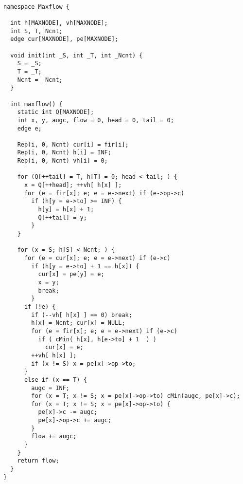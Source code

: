 \begin{lstlisting}

namespace Maxflow {

  int h[MAXNODE], vh[MAXNODE];
  int S, T, Ncnt;
  edge cur[MAXNODE], pe[MAXNODE];

  void init(int _S, int _T, int _Ncnt) {
    S = _S;
    T = _T;
    Ncnt = _Ncnt;
  }

  int maxflow() {
    static int Q[MAXNODE];
    int x, y, augc, flow = 0, head = 0, tail = 0;
    edge e;
    
    Rep(i, 0, Ncnt) cur[i] = fir[i];
    Rep(i, 0, Ncnt) h[i] = INF;
    Rep(i, 0, Ncnt) vh[i] = 0;

    for (Q[++tail] = T, h[T] = 0; head < tail; ) {
      x = Q[++head]; ++vh[ h[x] ];
      for (e = fir[x]; e; e = e->next) if (e->op->c)
        if (h[y = e->to] >= INF) {
          h[y] = h[x] + 1;
          Q[++tail] = y;
        }
    }

    for (x = S; h[S] < Ncnt; ) {
      for (e = cur[x]; e; e = e->next) if (e->c)
        if (h[y = e->to] + 1 == h[x]) {
          cur[x] = pe[y] = e;
          x = y;
          break;
        }
      if (!e) {
        if (--vh[ h[x] ] == 0) break;
        h[x] = Ncnt; cur[x] = NULL;
        for (e = fir[x]; e; e = e->next) if (e->c)
          if ( cMin( h[x], h[e->to] + 1  ) )
            cur[x] = e;
        ++vh[ h[x] ];
        if (x != S) x = pe[x]->op->to;
      }
      else if (x == T) {
        augc = INF;
        for (x = T; x != S; x = pe[x]->op->to) cMin(augc, pe[x]->c);
        for (x = T; x != S; x = pe[x]->op->to) {
          pe[x]->c -= augc;
          pe[x]->op->c += augc;
        }
        flow += augc;
      }
    }
    return flow;
  }
}


\end{lstlisting}